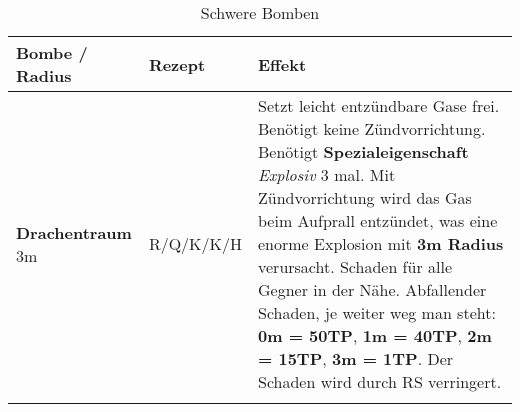 \begin{longtable}{|p{4cm}|p{}|p{9cm}|}
\hline
\textbf{Bombe} / Radius & \textbf{Rezept} & \textbf{Effekt} \\ \hline

\textbf{Drachentraum} \newline 3m & R/Q/K/K/H & Setzt leicht entzündbare Gase frei. Benötigt keine Zündvorrichtung. Benötigt \textbf{Spezialeigenschaft} \textit{Explosiv} 3 mal. Mit Zündvorrichtung wird das Gas beim Aufprall entzündet, was eine enorme Explosion mit \textbf{3m Radius} verursacht. Schaden für alle Gegner in der Nähe. Abfallender Schaden, je weiter weg man steht: \textbf{0m = 50TP}, \textbf{1m = 40TP}, \textbf{2m = 15TP}, \textbf{3m = 1TP}. Der Schaden wird durch RS verringert. \\ \hline

\caption{Schwere Bomben}
\label{tab:schwere_bomben}
\end{longtable}